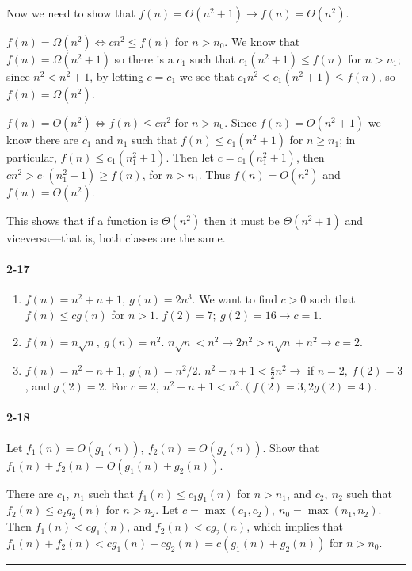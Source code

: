\documentclass{report}
\newcommand{\okthen}{\rule[-1.4pt]{0.3em}{0.77em}}
\begin{document}
\medskip

Now we need to show that $f(n) = \Theta(n^2+1) \to f(n) = \Theta(n^2)$.

$f(n) = \Omega(n^2) \iff c n^2 \le f(n)$ for $n > n_0$. We know that $f(n) = \Omega(n^2+1)$ so there is a $c_1$ such that $c_1\left(n^2+1\right) \le f(n)$ for $n > n_1$; since $n^2 < n^2 + 1$, by letting $c = c_1$ we see that $c_1 n^2 < c_1 \left(n^2+1\right) \le f(n)$, so $f(n) = \Omega(n^2)$.

$f(n) = O(n^2) \iff f(n) \le c n^2$ for $n > n_0$. Since $f(n) = O(n^2 + 1)$ we know there are $c_1$ and $n_1$ such that $f(n) \le c_1\left(n^2+1\right)$ for $n \ge n_1$; in particular, $f(n) \le c_1\left(n_1^2+1\right)$. Then let $c = c_1\left(n_1^2+1\right)$, then $c n^2 > c_1\left(n_1^2+1\right) \ge f(n)$, for $n > n_1$. Thus $f(n) = O(n^2)$ and $f(n) = \Theta(n^2)$.

\medskip

This shows that if a function is $\Theta(n^2)$ then it must be $\Theta(n^2+1)$ and viceversa---that is, both classes are the same.

\paragraph{2-17}
\begin{enumerate}[label=\alph*)]
	\item $f(n) = n^2 + n + 1,\ g(n) = 2n^3$. We want to find $c > 0$ such that $f(n) \le c g(n)$ for $n > 1$. $f(2) = 7;\ g(2) = 16 \to c = 1$.
	\item $f(n) = n\sqrt{n},\ g(n) = n^2$. $n\sqrt{n} < n^2 \to 2n^2 > n\sqrt{n} + n^2 \to c = 2$.
	\item $f(n) = n^2 - n + 1,\ g(n) = n^2/2$. $n^2 - n + 1 < \frac{c}{2}n^2 \to$ if $n = 2,\ f(2) = 3$, and $g(2) = 2$. For $c=2,\ n^2 - n + 1 < n^2. (f(2) = 3, 2g(2) = 4)$.
\end{enumerate}

\paragraph{2-18} Let $f_1(n) = O(g_1(n)),\ f_2(n) = O(g_2(n))$. Show that $f_1(n) + f_2(n) = O(g_1(n) + g_2(n))$.

\medskip

There are $c_1,\ n_1$ such that $f_1(n) \le c_1 g_1(n)$ for $n > n_1$, and $c_2,\ n_2$ such that $f_2(n) \le c_2 g_2(n)$ for $n > n_2$. Let $c = \max(c_1, c_2),\ n_0 = \max(n_1, n_2)$. Then $f_1(n) < c g_1(n)$, and $f_2(n) < c g_2(n)$, which implies that $f_1(n) + f_2(n) < c g_1(n) + c g_2(n) = c(g_1(n) + g_2(n))$ for $n > n_0$.\ \okthen
\end{document}
